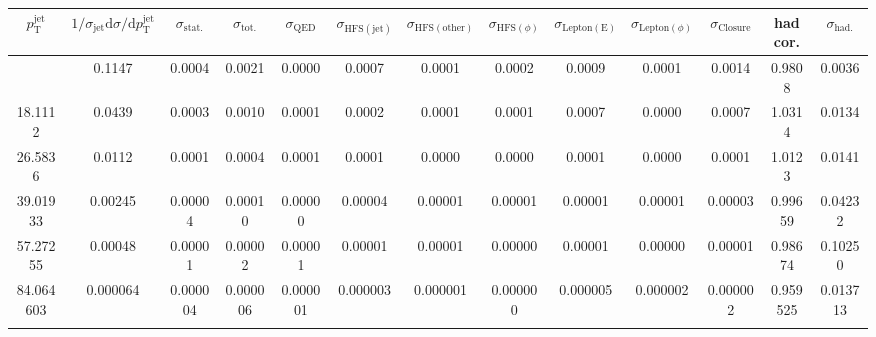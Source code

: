 \begin{table}[h!]\n\centering\n\begin{adjustbox}{width=1\textwidth}\n\begin{tabular}{| c | c | c | c || c | c | c | c | c | c | c || c | c |}\n\hline\n$p_\mathrm{T}^\mathrm{jet}$&$1/\sigma_\mathrm{jet}\mathrm{d}\sigma/\mathrm{d}p_\mathrm{T}^\mathrm{jet}$& $\sigma_\mathrm{stat.}$& $\sigma_\mathrm{tot.}$&$\sigma_\mathrm{QED}$&$\sigma_\mathrm{HFS(jet)}$&$\sigma_\mathrm{HFS(other)}$ &$\sigma_{\mathrm{HFS}(\phi)}$&$\sigma_\mathrm{Lepton(E)}$&$\sigma_{\mathrm{Lepton}(\phi)}$&$\sigma_\mathrm{Closure}$ & had cor. & $\sigma_\mathrm{had.}$\\
\hline\n12.3390&0.1147&0.0004&0.0021&0.0000&0.0007&0.0001&0.0002&0.0009&0.0001&0.0014&0.9808&0.0036 \\
18.1112&0.0439&0.0003&0.0010&0.0001&0.0002&0.0001&0.0001&0.0007&0.0000&0.0007&1.0314&0.0134 \\
26.5836&0.0112&0.0001&0.0004&0.0001&0.0001&0.0000&0.0000&0.0001&0.0000&0.0001&1.0123&0.0141 \\
39.01933&0.00245&0.00004&0.00010&0.00000&0.00004&0.00001&0.00001&0.00001&0.00001&0.00003&0.99659&0.04232 \\
57.27255&0.00048&0.00001&0.00002&0.00001&0.00001&0.00001&0.00000&0.00001&0.00000&0.00001&0.98674&0.10250 \\
84.064603&0.000064&0.000004&0.000006&0.000001&0.000003&0.000001&0.000000&0.000005&0.000002&0.000002&0.959525&0.013713 \\
\hline\n\end{tabular}\n\end{adjustbox}\n\end{table}\n
